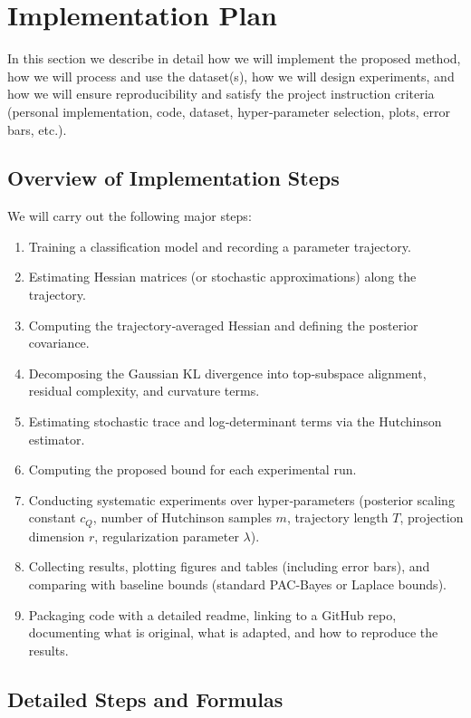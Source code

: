 \section{Implementation Plan}

In this section we describe in detail how we will implement the proposed method, how we will process and use the dataset(s), how we will design experiments, and how we will ensure reproducibility and satisfy the project instruction criteria (personal implementation, code, dataset, hyper‑parameter selection, plots, error bars, etc.).

\subsection{Overview of Implementation Steps}

We will carry out the following major steps:
\begin{enumerate}[noitemsep]
  \item Training a classification model and recording a parameter trajectory.
  \item Estimating Hessian matrices (or stochastic approximations) along the trajectory.
  \item Computing the trajectory‐averaged Hessian and defining the posterior covariance.
  \item Decomposing the Gaussian KL divergence into top‑subspace alignment, residual complexity, and curvature terms.
  \item Estimating stochastic trace and log‐determinant terms via the Hutchinson estimator.
  \item Computing the proposed bound for each experimental run.
  \item Conducting systematic experiments over hyper‐parameters (posterior scaling constant \(c_Q\), number of Hutchinson samples \(m\), trajectory length \(T\), projection dimension \(r\), regularization parameter \(\lambda\)).
  \item Collecting results, plotting figures and tables (including error bars), and comparing with baseline bounds (standard PAC‑Bayes or Laplace bounds).
  \item Packaging code with a detailed readme, linking to a GitHub repo, documenting what is original, what is adapted, and how to reproduce the results.
\end{enumerate}

\subsection{Detailed Steps and Formulas}

